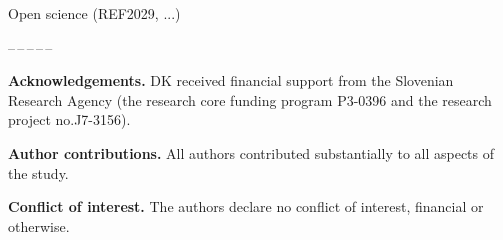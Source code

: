 \documentclass[amsfonts, amssymb, prl, superscriptaddress, notitlepage, twocolumn, nofootinbib]{revtex4-2}
\begin{document}
Open science (REF2029, ...)
  
\begin{center}
--\,--\,--\,--\,--
\end{center}
\vspace{1mm}
\noindent\textbf{Acknowledgements.} DK received financial support from the Slovenian Research Agency (the research core funding program P3-0396 and the research project no.J7-3156). 


\noindent\textbf{Author contributions.} All authors contributed substantially to all aspects of the study.

\noindent\textbf{Conflict of interest.} The authors declare no conflict of interest, financial or otherwise.


{}

\end{document}
